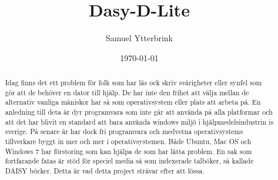 \documentclass{report}
\begin{document}
\title{Dasy-D-Lite}
\author{Samuel Ytterbrink}
\date{\today}
\maketitle


\begin{abstract}
Idag finns det ett problem för folk som har läs ock skriv svårigheter eller synfel som gör att de  behöver en dator till hjälp. De har inte den frihet att välja mellan de alternativ vanliga mäniskor har så som operativsystem eller plats att arbeta på. En anledning till deta är dyr programvara som inte går att använda på alla platformar och att det har blivit en standard att bara använda windows miljö i hjälpmedelsindustrin is sverige. På senare år har dock fri programvara och medvetna operativsystems tillverkare byggt in mer och mer i operativsystemen. Både Ubuntu, Mac OS och Windows 7 har förstoring som kan hjälpa de som har lätta problem. En sak som fortfarande fatas är stöd för speciel media så som indexerade talböker, så kallade DAISY böcker. Detta är vad detta project strävar efter att lössa.
\end{abstract}
\end{document}
